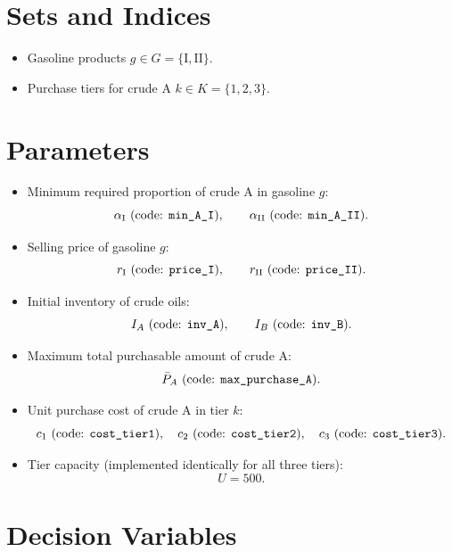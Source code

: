 \section*{Sets and Indices}

\begin{itemize}
    \item Gasoline products $g \in G = \{\mathrm{I}, \mathrm{II}\}$.
    \item Purchase tiers for crude A $k \in K = \{1,2,3\}$.
\end{itemize}

\section*{Parameters}

\begin{itemize}
    \item Minimum required proportion of crude A in gasoline $g$:
    \[
    \alpha_{\mathrm{I}} \text{ (code: \texttt{min\_A\_I})}, \qquad
    \alpha_{\mathrm{II}} \text{ (code: \texttt{min\_A\_II})}.
    \]
    \item Selling price of gasoline $g$:
    \[
    r_{\mathrm{I}} \text{ (code: \texttt{price\_I})}, \qquad
    r_{\mathrm{II}} \text{ (code: \texttt{price\_II})}.
    \]
    \item Initial inventory of crude oils:
    \[
    I_A \text{ (code: \texttt{inv\_A})}, \qquad
    I_B \text{ (code: \texttt{inv\_B})}.
    \]
    \item Maximum total purchasable amount of crude A:
    \[
    \bar P_A \text{ (code: \texttt{max\_purchase\_A})}.
    \]
    \item Unit purchase cost of crude A in tier $k$:
    \[
    c_1 \text{ (code: \texttt{cost\_tier1})}, \quad
    c_2 \text{ (code: \texttt{cost\_tier2})}, \quad
    c_3 \text{ (code: \texttt{cost\_tier3})}.
    \]
    \item Tier capacity (implemented identically for all three tiers):
    \[
    U = 500.
    \]
\end{itemize}

\section*{Decision Variables}

